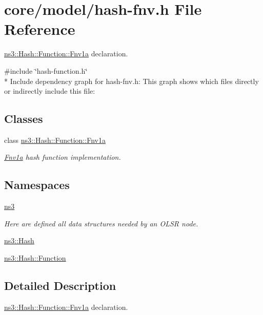\hypertarget{hash-fnv_8h}{}\section{core/model/hash-\/fnv.h File Reference}
\label{hash-fnv_8h}


\hyperlink{classns3_1_1Hash_1_1Function_1_1Fnv1a}{ns3\+::\+Hash\+::\+Function\+::\+Fnv1a} declaration.  


{\ttfamily \#include \char`\"{}hash-\/function.\+h\char`\"{}}\\*
Include dependency graph for hash-\/fnv.h\+:
This graph shows which files directly or indirectly include this file\+:
\subsection*{Classes}
\begin{DoxyCompactItemize}
\item 
class \hyperlink{classns3_1_1Hash_1_1Function_1_1Fnv1a}{ns3\+::\+Hash\+::\+Function\+::\+Fnv1a}
\begin{DoxyCompactList}\small\item\em \hyperlink{classns3_1_1Hash_1_1Function_1_1Fnv1a}{Fnv1a} hash function implementation. \end{DoxyCompactList}\end{DoxyCompactItemize}
\subsection*{Namespaces}
\begin{DoxyCompactItemize}
\item 
 \hyperlink{namespacens3}{ns3}
\begin{DoxyCompactList}\small\item\em Here are defined all data structures needed by an O\+L\+SR node. \end{DoxyCompactList}\item 
 \hyperlink{namespacens3_1_1Hash}{ns3\+::\+Hash}
\item 
 \hyperlink{namespacens3_1_1Hash_1_1Function}{ns3\+::\+Hash\+::\+Function}
\end{DoxyCompactItemize}


\subsection{Detailed Description}
\hyperlink{classns3_1_1Hash_1_1Function_1_1Fnv1a}{ns3\+::\+Hash\+::\+Function\+::\+Fnv1a} declaration. 

